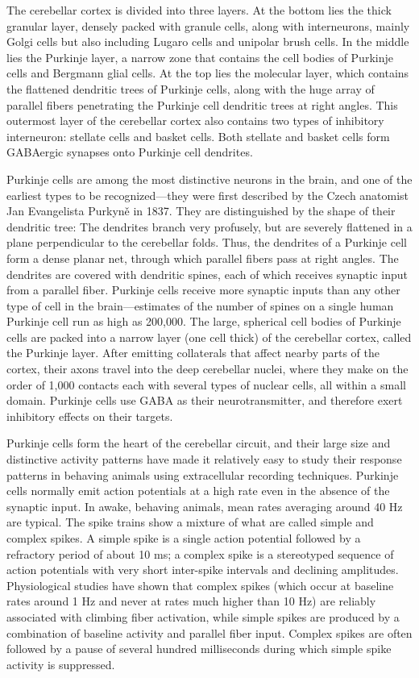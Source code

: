 \documentclass[]{book}
\begin{document}
The cerebellar cortex is divided into three layers. At the bottom lies the thick granular layer, densely packed with granule cells, along with interneurons, mainly Golgi cells but also including Lugaro cells and unipolar brush cells. In the middle lies the Purkinje layer, a narrow zone that contains the cell bodies of Purkinje cells and Bergmann glial cells. At the top lies the molecular layer, which contains the flattened dendritic trees of Purkinje cells, along with the huge array of parallel fibers penetrating the Purkinje cell dendritic trees at right angles. This outermost layer of the cerebellar cortex also contains two types of inhibitory interneuron: stellate cells and basket cells. Both stellate and basket cells form GABAergic synapses onto Purkinje cell dendrites.

Purkinje cells are among the most distinctive neurons in the brain, and one of the earliest types to be recognized---they were first described by the Czech anatomist Jan Evangelista Purkyně in 1837. They are distinguished by the shape of their dendritic tree: The dendrites branch very profusely, but are severely flattened in a plane perpendicular to the cerebellar folds. Thus, the dendrites of a Purkinje cell form a dense planar net, through which parallel fibers pass at right angles. The dendrites are covered with dendritic spines, each of which receives synaptic input from a parallel fiber. Purkinje cells receive more synaptic inputs than any other type of cell in the brain---estimates of the number of spines on a single human Purkinje cell run as high as 200,000. The large, spherical cell bodies of Purkinje cells are packed into a narrow layer (one cell thick) of the cerebellar cortex, called the Purkinje layer. After emitting collaterals that affect nearby parts of the cortex, their axons travel into the deep cerebellar nuclei, where they make on the order of 1,000 contacts each with several types of nuclear cells, all within a small domain. Purkinje cells use GABA as their neurotransmitter, and therefore exert inhibitory effects on their targets.

Purkinje cells form the heart of the cerebellar circuit, and their large size and distinctive activity patterns have made it relatively easy to study their response patterns in behaving animals using extracellular recording techniques. Purkinje cells normally emit action potentials at a high rate even in the absence of the synaptic input. In awake, behaving animals, mean rates averaging around 40 Hz are typical. The spike trains show a mixture of what are called simple and complex spikes. A simple spike is a single action potential followed by a refractory period of about 10 ms; a complex spike is a stereotyped sequence of action potentials with very short inter-spike intervals and declining amplitudes. Physiological studies have shown that complex spikes (which occur at baseline rates around 1 Hz and never at rates much higher than 10 Hz) are reliably associated with climbing fiber activation, while simple spikes are produced by a combination of baseline activity and parallel fiber input. Complex spikes are often followed by a pause of several hundred milliseconds during which simple spike activity is suppressed.
\end{document}

